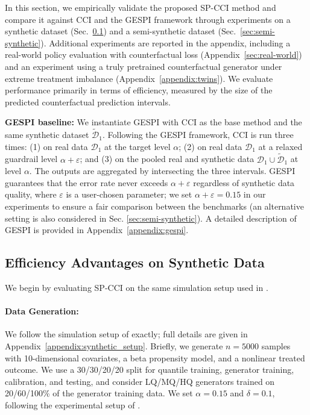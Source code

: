 \documentclass{article}
\theoremstyle{plain}
\theoremstyle{definition}
\theoremstyle{remark}
\begin{document}
In this section, we empirically validate the proposed SP-CCI method and compare it
against CCI \citep{lei2021conformal} and the GESPI framework \citep{bashari2026statistical} through experiments on a synthetic dataset
(Sec.~\ref{sec:synthetic_exp}) and a semi-synthetic dataset
(Sec.~\ref{sec:semi-synthetic}).
Additional experiments are reported in the appendix, including a real-world policy
evaluation with counterfactual loss (Appendix~\ref{sec:real-world}) and an experiment
using a truly pretrained counterfactual generator under extreme treatment imbalance
(Appendix~\ref{appendix:twins}). We evaluate performance primarily in terms of
efficiency, measured by the size of the predicted counterfactual prediction intervals.

\textbf{GESPI baseline:} We instantiate GESPI \citep{bashari2026statistical} with CCI \citep{lei2021conformal} as the base method and the same synthetic dataset $\tilde{\mathcal{D}}_1$. Following the GESPI framework, CCI is run three times: (1) on real data $\mathcal{D}_1$ at the target level $\alpha$; (2) on real data $\mathcal{D}_1$ at a relaxed guardrail level $\alpha + \varepsilon$; and (3) on the pooled real and synthetic data $\mathcal{D}_1 \cup \tilde{\mathcal{D}}_1$ at level $\alpha$. The outputs are aggregated by intersecting the three intervals. GESPI guarantees that the error rate never exceeds $\alpha + \varepsilon$ regardless of synthetic data quality, where $\varepsilon$ is a user-chosen parameter; we set $\alpha + \varepsilon  =0.15$ in our experiments to ensure a fair comparison between the benchmarks (an alternative setting is also considered in Sec. \ref{sec:semi-synthetic}). A detailed description of GESPI is provided in Appendix~\ref{appendix:gespi}.


\subsection{Efficiency Advantages on Synthetic Data}
\label{sec:synthetic_exp}

We begin by evaluating SP-CCI on the same simulation setup used in \citep{lei2021conformal}.

\paragraph{Data Generation:} We follow the simulation setup of \citep{lei2021conformal, wager2018estimation} exactly; full details are given in Appendix~\ref{appendix:synthetic_setup}. Briefly, we generate $n=5000$ samples with 10-dimensional covariates, a beta propensity model, and a nonlinear treated outcome. We use a 30/30/20/20 split for quantile training, generator training, calibration, and testing, and consider LQ/MQ/HQ generators trained on 20/60/100\% of the generator training data. We set $\alpha = 0.15$ and $\delta = 0.1$, following the experimental setup of \citep{einbinder2024semi}.
\end{document}

